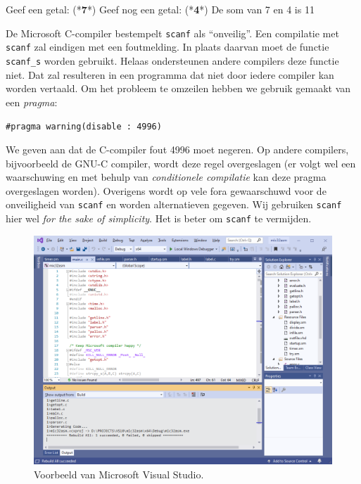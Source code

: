 \documentclass[12pt,a4paper,final,twoside,fleqn]{book}
\begin{document}
\begin{dosbox}[title=Uitvoer van het programma in listing~\ref{cod:sumoftwo}.,label=fig:unuitvoerprog]
  Geef een getal: (*\textbf{7}*)
  Geef nog een getal: (*\textbf{4}*)
  De som van 7 en 4 is 11
\end{dosbox}
\begin{infobox}
  \label{fig:unopmerkingscanf}%
  De Microsoft C-compiler bestempelt \texttt{scanf} als ``onveilig''. Een compilatie met \texttt{scanf} zal eindigen met een foutmelding. In plaats daarvan moet de functie \texttt{scanf\_s} worden gebruikt. Helaas ondersteunen andere compilers deze functie niet. Dat zal resulteren in een programma dat niet door iedere compiler kan worden vertaald. Om het probleem te omzeilen hebben we gebruik gemaakt van een \textsl{pragma}:

  \hspace*{1em}\texttt{\#pragma warning(disable : 4996)}

  We geven aan dat de C-compiler fout 4996 moet negeren. Op andere compilers, bijvoorbeeld de GNU-C compiler, wordt deze regel overgeslagen (er volgt wel een waarschuwing en met behulp van \textsl{conditionele compilatie} kan deze pragma overgeslagen worden). Overigens wordt op vele fora gewaarschuwd voor de onveiligheid van \texttt{scanf} en worden alternatieven gegeven. Wij gebruiken \texttt{scanf} hier wel \textsl{for the sake of simplicity}. Het is beter om \texttt{scanf} te vermijden.
\end{infobox}

\begin{figure}[!ht]
  \centering
  \includegraphics[width=\textwidth]{images/vs2019}
  \caption{Voorbeeld van Microsoft Visual Studio.}
  \label{fig:unvs2019}
\end{figure}
\end{document}
